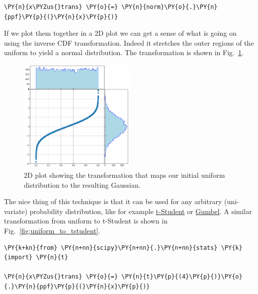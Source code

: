 \begin{tcolorbox}[breakable, size=fbox, boxrule=1pt, pad at break*=1mm,colback=cellbackground, colframe=cellborder]
\begin{Verbatim}[commandchars=\\\{\}]
\PY{n}{x\PYZus{}trans} \PY{o}{=} \PY{n}{norm}\PY{o}{.}\PY{n}{ppf}\PY{p}{(}\PY{n}{x}\PY{p}{)}
\end{Verbatim}
\end{tcolorbox}

If we plot them together in a 2D plot we can get a sense of what is
going on using the inverse CDF transformation.
Indeed it stretches the outer regions of the uniform to yield a
normal distribution. The transformation is shown in Fig.~\ref{fig:uniform_to_gauss}. 
    
\begin{figure}[htbp]
  \centering
  \includegraphics[width=0.5\textwidth]{figures/lesson6_7_0.png}
  \caption{2D plot showing the transformation that maps our initial uniform distribution to the resulting Gaussian.}
  \label{fig:uniform_to_gauss}
\end{figure}
    
The nice thing of this technique is that it can be used
for any arbitrary (uni-variate) probability distribution, like for
example \href{https://en.wikipedia.org/wiki/Student\%27s\_t-distribution}{t-Student}
or \href{https://en.wikipedia.org/wiki/Gumbel_distribution}{Gumbel}.
A similar transformation from uniform to t-Student is shown in Fig.~\ref{fig:uniform_to_tstudent}.

\begin{tcolorbox}[breakable, size=fbox, boxrule=1pt, pad at break*=1mm,colback=cellbackground, colframe=cellborder]
\begin{Verbatim}[commandchars=\\\{\}]
\PY{k+kn}{from} \PY{n+nn}{scipy}\PY{n+nn}{.}\PY{n+nn}{stats} \PY{k}{import} \PY{n}{t}

\PY{n}{x\PYZus{}trans} \PY{o}{=} \PY{n}{t}\PY{p}{(4}\PY{p}{)}\PY{o}{.}\PY{n}{ppf}\PY{p}{(}\PY{n}{x}\PY{p}{)}
\end{Verbatim}
\end{tcolorbox}

